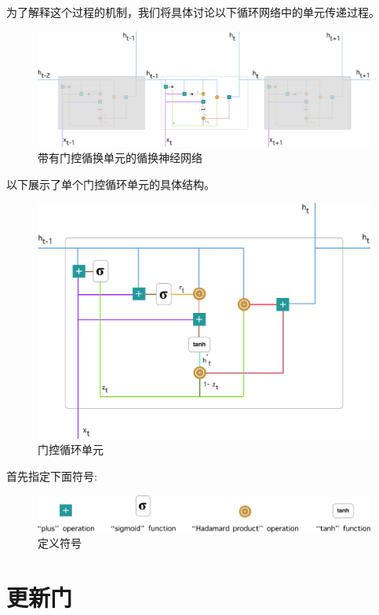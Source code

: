 \documentclass{article}
\begin{document}
为了解释这个过程的机制，我们将具体讨论以下循环网络中的单元传递过程。
\begin{figure}[H]
	\centering
	\includegraphics[scale=0.2]{GRU1.png}
	\caption{带有门控循换单元的循换神经网络}
\end{figure}
以下展示了单个门控循环单元的具体结构。
\begin{figure}[H]
	\centering
	\includegraphics[scale=0.2]{GRU2.png}
	\caption{门控循环单元}
\end{figure}
首先指定下面符号:
\begin{figure}[H]
	\centering
	\includegraphics[scale=0.2]{GRU3.png}
	\caption{定义符号}
\end{figure}
\section{更新门}
\end{document}
